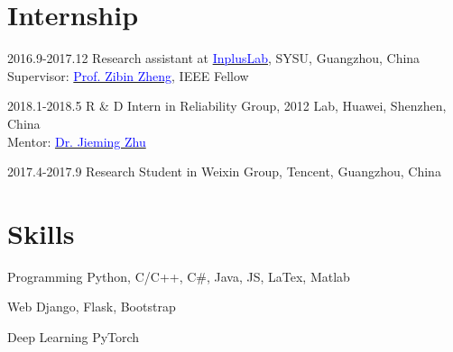 \documentclass[12pt,letterpaper]{report}
\begin{document}
    \section*{Internship}
    \begin{tablist}
        \item[2016.9-2017.12] \tab{}Research assistant at \href{https://inpluslab.com/}{\textcolor{blue}{InplusLab}}, SYSU, Guangzhou, China \\ Supervisor: \href{https://www.zibinzheng.com/}{\textcolor{blue}{Prof. Zibin Zheng}}, IEEE Fellow
        \item[2018.1-2018.5] \tab{}R \& D Intern in Reliability Group, 2012 Lab, Huawei, Shenzhen, China \\ Mentor: \href{https://jiemingzhu.github.io/}{\textcolor{blue}{Dr. Jieming Zhu}}
        \item[2017.4-2017.9] \tab{}Research Student in Weixin Group, Tencent, Guangzhou, China
    \end{tablist}

    \section*{Skills}
    \begin{tablist}
        \item[Programming] \tab{}Python, C/C++, C\#, Java, JS, LaTex, Matlab
        \item[Web] \tab{}Django, Flask, Bootstrap
        \item[Deep Learning] \tab{}PyTorch
    \end{tablist}
\end{document}
